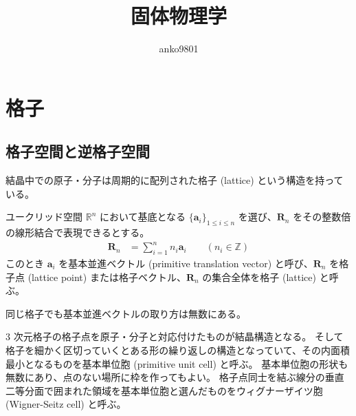 \documentclass[uplatex,dvipdfmx,a4paper,11pt]{jlreq}
\title{固体物理学}
\author{anko9801}
\newcommand{\RR}{\mathbb{R}}
\newcommand{\ZZ}{\mathbb{Z}}
\newcommand{\R}{\bm{R}}
\renewcommand{\aa}{\bm{a}}
\numberwithin{equation}{section}
\theoremstyle{definition}
\begin{document}
\maketitle
\tableofcontents
\clearpage

\section{格子}

\subsection{格子空間と逆格子空間}
結晶中での原子・分子は周期的に配列された格子 (lattice) という構造を持っている。
\begin{definition}[格子]
  ユークリッド空間 $\RR^n$ において基底となる $\{\aa_i\}_{1\leq i\leq n}$ を選び、$\R_n$ をその整数倍の線形結合で表現できるとする。
  \begin{align}
    \R_n & = \sum_{i = 1}^n n_i\aa_i \qquad (n_i\in\ZZ)
  \end{align}
  このとき $\aa_i$ を基本並進ベクトル (primitive translation vector) と呼び、$\R_n$ を格子点 (lattice point) または格子ベクトル、$\R_n$ の集合全体を格子 (lattice) と呼ぶ。
\end{definition}
\begin{theorem}
  同じ格子でも基本並進ベクトルの取り方は無数にある。\\
\end{theorem}

3 次元格子の格子点を原子・分子と対応付けたものが結晶構造となる。
そして格子を細かく区切っていくとある形の繰り返しの構造となっていて、その内面積最小となるものを基本単位胞 (primitive unit cell) と呼ぶ。
基本単位胞の形状も無数にあり、点のない場所に枠を作ってもよい。
格子点同士を結ぶ線分の垂直二等分面で囲まれた領域を基本単位胞と選んだものをウィグナーザイツ胞 (Wigner-Seitz cell) と呼ぶ。 \\
\end{document}
